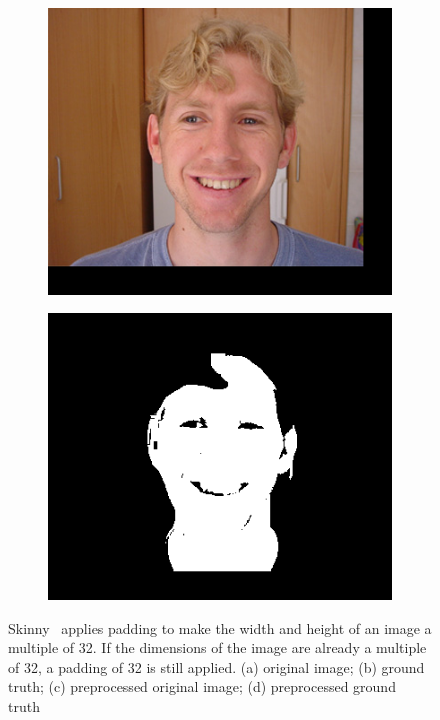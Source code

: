 \begin{figure}[h]
    \hfill
     \begin{subfigure}[b]{0.23\textwidth}
         \centering
         \includegraphics[width=\textwidth]{images/results/unet_padding_1311x.png}
         \caption{}
     \end{subfigure}
    \hfill
     \hfill
     \begin{subfigure}[b]{0.23\textwidth}
         \centering
         \includegraphics[width=\textwidth]{images/results/unet_padding_1311y.png}
         \caption{}
     \end{subfigure}
        \caption{Skinny~\cite{tarasiewicz2020skinny} applies padding to make the width and height of an image a multiple of 32. If the dimensions of the image are already a multiple of 32, a padding of 32 is still applied.
        (a) original image; (b) ground truth; (c) preprocessed original image; (d) preprocessed ground truth}
        \label{fig:skinny-padding}
\end{figure}


